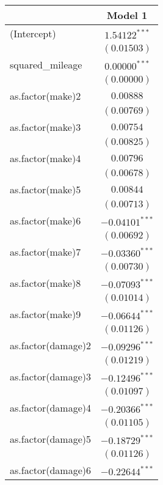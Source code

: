 
\begin{table}
\begin{center}
\begin{tabular}{l c}
\hline
 & Model 1 \\
\hline
(Intercept)         & $1.54122^{***}$  \\
                    & $(0.01503)$      \\
squared\_mileage    & $0.00000^{***}$  \\
                    & $(0.00000)$      \\
as.factor(make)2    & $0.00888$        \\
                    & $(0.00769)$      \\
as.factor(make)3    & $0.00754$        \\
                    & $(0.00825)$      \\
as.factor(make)4    & $0.00796$        \\
                    & $(0.00678)$      \\
as.factor(make)5    & $0.00844$        \\
                    & $(0.00713)$      \\
as.factor(make)6    & $-0.04101^{***}$ \\
                    & $(0.00692)$      \\
as.factor(make)7    & $-0.03360^{***}$ \\
                    & $(0.00730)$      \\
as.factor(make)8    & $-0.07093^{***}$ \\
                    & $(0.01014)$      \\
as.factor(make)9    & $-0.06644^{***}$ \\
                    & $(0.01126)$      \\
as.factor(damage)2  & $-0.09296^{***}$ \\
                    & $(0.01219)$      \\
as.factor(damage)3  & $-0.12496^{***}$ \\
                    & $(0.01097)$      \\
as.factor(damage)4  & $-0.20366^{***}$ \\
                    & $(0.01105)$      \\
as.factor(damage)5  & $-0.18729^{***}$ \\
                    & $(0.01126)$      \\
as.factor(damage)6  & $-0.22644^{***}$ \\

\end{tabular}
\end{center}
\end{table}
